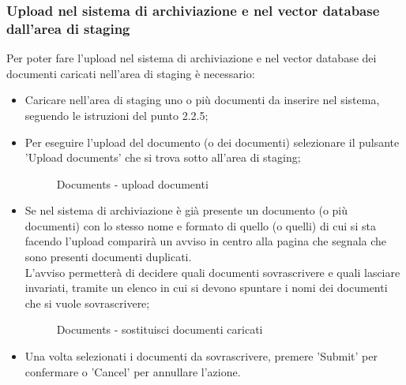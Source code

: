 \documentclass[10pt, a4paper]{article}
\begin{document}
\subsubsection{Upload nel sistema di archiviazione e nel vector database dall'area di staging}
Per poter fare l’upload nel sistema di archiviazione e nel vector database dei documenti caricati nell’area di staging è necessario:
\begin{itemize}
    \item Caricare nell'area di staging uno o più documenti da inserire nel sistema, seguendo le istruzioni del punto 2.2.5; 
    \item Per eseguire l'upload del documento (o dei documenti) selezionare il pulsante 'Upload documents' che si trova sotto all'area di staging;
    \begin{figure}[H]
        \centering  
        \caption{Documents - upload documenti}
        \label{img:docsupload}
    \end{figure}
    \item Se nel sistema di archiviazione è già presente un documento (o più documenti) con lo stesso nome e formato di quello (o quelli) di cui si sta facendo l'upload comparirà un avviso in centro alla pagina che segnala che sono presenti documenti duplicati. \\L'avviso permetterà di decidere quali documenti sovrascrivere e quali lasciare invariati, tramite un elenco in cui si devono spuntare i nomi dei documenti che si vuole sovrascrivere;
    \begin{figure}[H]
        \centering  
        \caption{Documents - sostituisci documenti caricati}
        \label{img:docsStageSubstitute}
    \end{figure}
    \item Una volta selezionati i documenti da sovrascrivere, premere 'Submit' per confermare o 'Cancel' per annullare l'azione.    
\end{itemize}
\end{document}
